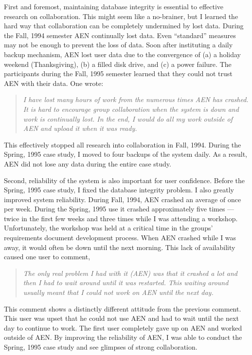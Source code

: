 First and foremost, maintaining database integrity is essential to
effective research on collaboration.  This might seem like a no-brainer,
but I learned the hard way that collaboration can be completely undermined
by lost data.  During the Fall, 1994 semester AEN continually lost data.
Even ``standard'' measures may not be enough to prevent the loss of data.
Soon after instituting a daily backup mechanism, AEN lost user data due to
the convergence of (a) a holiday weekend (Thanksgiving), (b) a filled disk
drive, and (c) a power failure.  The participants during the Fall, 1995
semester learned that they could not trust AEN with their data.  One wrote: 
\begin{quote}
  {\em
  I have lost many hours of work from the numerous times AEN has crashed.
  It is hard to encourage group collaboration when the system is down and
  work is continually lost.  In the end, I would do all my work outside of
  AEN and upload it when it was ready.
  } 
\end{quote}
This effectively stopped all research into collaboration in Fall, 1994.
During the Spring, 1995 case study, I moved to four backups of the system
daily.  As a result, AEN did not lose any data during the entire case study.

Second, reliability of the system is also important for user confidence.
Before the Spring, 1995 case study, I fixed the database integrity problem.
I also greatly improved system reliability.  During Fall, 1994,
AEN crashed an average of once per week.  During the Spring, 1995 use it
crashed approximately five times --- twice in the first few weeks and three
times while I was attending a workshop.  Unfortunately, the workshop was
held at a critical time in the groups' requirements document development
process.  When AEN crashed while I was away, it would often be down until
the next morning.  This lack of availability caused one user to comment,
\begin{quote}
  {\em
  The only real problem I had with it (AEN) was that it crashed a lot and
  then I had to wait around until it was restarted.  This waiting around
  usually meant that I could not work on AEN until the next day.
  }
\end{quote}
This comment shows a distinctly different attitude from the previous
comment.  This user was upset that he could not use AEN and had to wait
until the next day to continue to work.  The first user completely gave up
on AEN and worked outside of AEN.  By improving the reliability of AEN, I
was able to conduct the Spring, 1995 case study and see glimpses of strong
collaboration.



